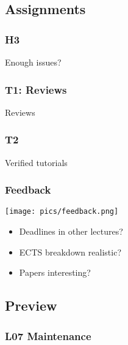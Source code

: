 \subsection{Assignments}

\begin{assignment}
	\frametitle{H3}

	\begin{task}
	Enough issues?
	\end{task}
\end{assignment}

\begin{assignment}
	\frametitle{T1: Reviews}

	\begin{task}
	Reviews
	\end{task}
\end{assignment}

\begin{assignment}
	\frametitle{T2}

	\begin{task}
	Verified tutorials
	\end{task}
\end{assignment}


\begin{frame}
	\frametitle{Feedback}

	\hfill \texttt{[image: pics/feedback.png]}
	\vspace{-1cm}
	\begin{itemize}[<+-| alert@+>]
		\item Deadlines in other lectures?
		\item ECTS breakdown realistic?
		\item Papers interesting?
	\end{itemize}
\end{frame}

\subsection{Preview}

\begin{frame}
	\frametitle{L07 Maintenance}
\end{frame}


\appendix

\begin{frame}[allowframebreaks]
	
	
\end{frame}



